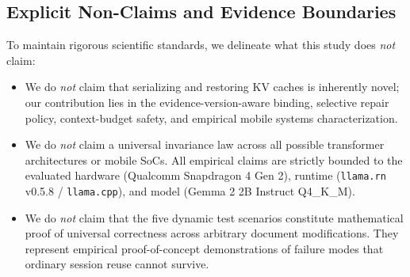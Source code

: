 \subsection{Explicit Non-Claims and Evidence Boundaries}
To maintain rigorous scientific standards, we delineate what this study does \emph{not} claim:
\begin{itemize}
    \item We do \emph{not} claim that serializing and restoring KV caches is inherently novel; our contribution lies in the evidence-version-aware binding, selective repair policy, context-budget safety, and empirical mobile systems characterization.
    \item We do \emph{not} claim a universal invariance law across all possible transformer architectures or mobile SoCs. All empirical claims are strictly bounded to the evaluated hardware (Qualcomm Snapdragon 4 Gen 2), runtime (\texttt{llama.rn} v0.5.8 / \texttt{llama.cpp}), and model (Gemma 2 2B Instruct Q4\_K\_M).
    \item We do \emph{not} claim that the five dynamic test scenarios constitute mathematical proof of universal correctness across arbitrary document modifications. They represent empirical proof-of-concept demonstrations of failure modes that ordinary session reuse cannot survive.
\end{itemize}
